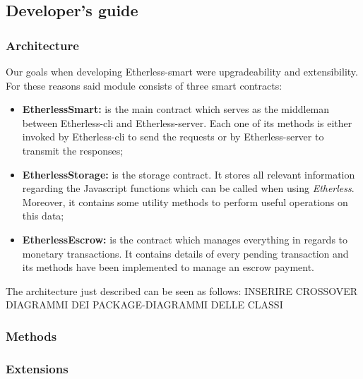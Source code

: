 	
	\subsection{Developer's guide}
	
		\subsubsection{Architecture} %
		Our goals when developing Etherless-smart were upgradeability and extensibility. For these reasons said module consists of three smart contracts:
		\begin{itemize}
			\item \textbf{EtherlessSmart:} is the main contract which serves as the middleman between Etherless-cli and Etherless-server. Each one of its methods is either invoked by Etherless-cli to send the requests or by Etherless-server to transmit the responses;
			\item \textbf{EtherlessStorage:} is the storage contract. It stores all relevant information regarding the Javascript functions which can be called when using \textit{Etherless}. Moreover, it contains some utility methods to perform useful operations on this data;
			\item \textbf{EtherlessEscrow:} is the contract which manages everything in regards to monetary transactions. It contains details of every pending transaction and its methods have been implemented to manage an escrow payment.
		\end{itemize}
The architecture just described can be seen as follows: INSERIRE CROSSOVER DIAGRAMMI DEI PACKAGE-DIAGRAMMI DELLE CLASSI
		
		\subsubsection{Methods} %
		
		
		
		\subsubsection{Extensions}  %